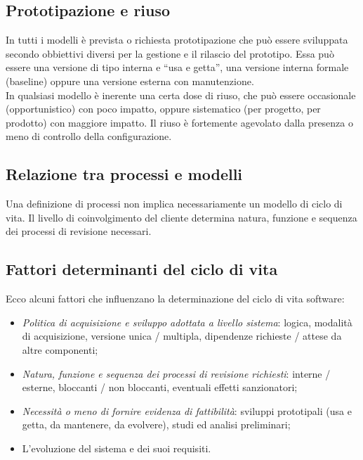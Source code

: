 \subsection{Prototipazione e riuso}
In tutti i modelli è prevista o richiesta prototipazione che può essere sviluppata secondo obbiettivi diversi per la gestione e il rilascio del prototipo. Essa può essere una versione di tipo interna e ``usa e getta'', una versione interna formale (baseline) oppure una versione esterna con manutenzione. \\
In qualsiasi modello è inerente una certa dose di riuso, che può essere occasionale (opportunistico) con poco impatto, oppure sistematico (per progetto, per prodotto) con maggiore impatto. Il riuso è fortemente agevolato dalla presenza o meno di controllo della configurazione.

\subsection{Relazione tra processi e modelli}
Una definizione di processi non implica necessariamente un modello di ciclo di vita. Il livello di coinvolgimento del cliente determina natura, funzione e sequenza dei processi di revisione necessari.

\subsection{Fattori determinanti del ciclo di vita}
Ecco alcuni fattori che influenzano la determinazione del ciclo di vita software:
\begin{itemize}
\item \textit{Politica di acquisizione e sviluppo adottata a livello sistema}: logica, modalità di acquisizione, versione unica / multipla, dipendenze richieste / attese da altre componenti;
\item \textit{Natura, funzione e sequenza dei processi di revisione richiesti}: interne / esterne, bloccanti / non bloccanti, eventuali effetti sanzionatori;
\item \textit{Necessità o meno di fornire evidenza di fattibilità}: sviluppi prototipali (usa e getta, da mantenere, da evolvere), studi ed analisi preliminari;
\item L'evoluzione del sistema e dei suoi requisiti.
\end{itemize}

